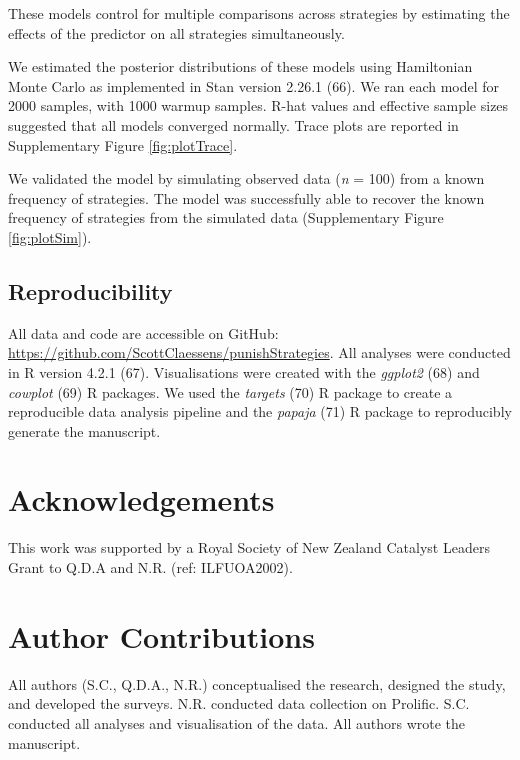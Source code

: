 \documentclass[
  man, donotrepeattitle,floatsintext]{apa6}
\begin{document}
These models control for multiple comparisons across strategies by estimating
the effects of the predictor on all strategies simultaneously.

We estimated the posterior distributions of these models using Hamiltonian Monte
Carlo as implemented in Stan version 2.26.1 (66). We ran each model for
2000 samples, with 1000 warmup samples. R-hat values and effective sample sizes
suggested that all models converged normally. Trace plots are reported in
Supplementary Figure \ref{fig:plotTrace}.

We validated the model by simulating observed data (\emph{n} = 100) from a known
frequency of strategies. The model was successfully able to recover the known
frequency of strategies from the simulated data (Supplementary Figure
\ref{fig:plotSim}).

\hypertarget{reproducibility}{%
\subsection{Reproducibility}\label{reproducibility}}

All data and code are accessible on GitHub:
\url{https://github.com/ScottClaessens/punishStrategies}. All analyses were conducted
in R version 4.2.1 (67). Visualisations were created with the \emph{ggplot2}
(68) and \emph{cowplot} (69) R packages. We used the \emph{targets}
(70) R package to create a reproducible data analysis pipeline and the
\emph{papaja} (71) R package to reproducibly generate the manuscript.

\newpage
\nolinenumbers

\hypertarget{acknowledgements}{%
\section{Acknowledgements}\label{acknowledgements}}

This work was supported by a Royal Society of New Zealand Catalyst Leaders Grant
to Q.D.A and N.R. (ref: ILFUOA2002).

\hypertarget{author-contributions}{%
\section{Author Contributions}\label{author-contributions}}

All authors (S.C., Q.D.A., N.R.) conceptualised the research, designed the
study, and developed the surveys. N.R. conducted data collection on Prolific.
S.C. conducted all analyses and visualisation of the data. All authors wrote the
manuscript.
\end{document}
